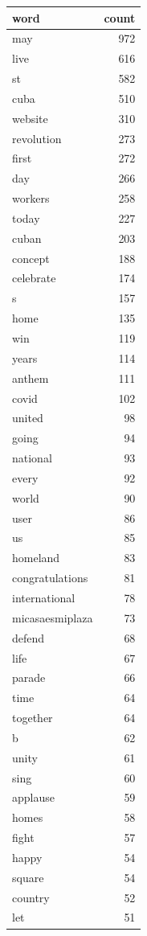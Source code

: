 \begin{tabular}{lr}
\toprule
word & count \\
\midrule
may & 972 \\
live & 616 \\
st & 582 \\
cuba & 510 \\
website & 310 \\
revolution & 273 \\
first & 272 \\
day & 266 \\
workers & 258 \\
today & 227 \\
cuban & 203 \\
concept & 188 \\
celebrate & 174 \\
s & 157 \\
home & 135 \\
win & 119 \\
years & 114 \\
anthem & 111 \\
covid & 102 \\
united & 98 \\
going & 94 \\
national & 93 \\
every & 92 \\
world & 90 \\
user & 86 \\
us & 85 \\
homeland & 83 \\
congratulations & 81 \\
international & 78 \\
micasaesmiplaza & 73 \\
defend & 68 \\
life & 67 \\
parade & 66 \\
time & 64 \\
together & 64 \\
b & 62 \\
unity & 61 \\
sing & 60 \\
applause & 59 \\
homes & 58 \\
fight & 57 \\
happy & 54 \\
square & 54 \\
country & 52 \\
let & 51 \\

\end{tabular}
